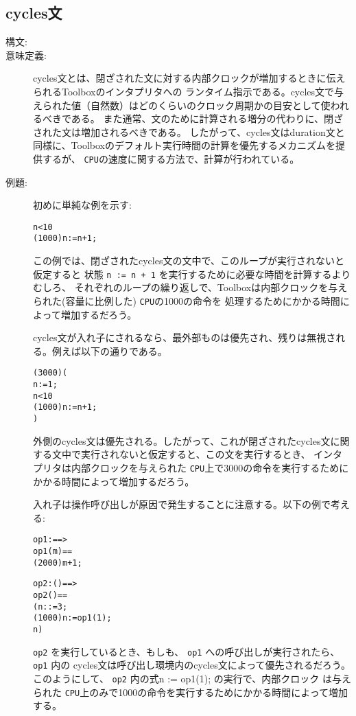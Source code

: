 \documentclass[\pformat,12pt]{jarticle}
\begin{document}
\subsection{cycles文}

\begin{description}
\item[構文:]

\item[意味定義:]
cycles文とは、閉ざされた文に対する内部クロックが増加するときに伝えられるToolboxのインタプリタへの
ランタイム指示である。cycles文で与えられた値（自然数）はどのくらいのクロック周期かの目安として使われるべきである。
また通常、文のために計算される増分の代わりに、閉ざされた文は増加されるべきである。
したがって、cycles文はduration文と同様に、Toolboxのデフォルト実行時間の計算を優先するメカニズムを提供するが、
 \texttt{CPU}の速度に関する方法で、計算が行われている。

\item[例題:]初めに単純な例を示す:
\begin{alltt}
       n < 10 
         (1000) n := n + 1; 
\end{alltt}
この例では、閉ざされたcycles文の文中で、このループが実行されないと仮定すると
状態 \texttt{n := n + 1} を実行するために必要な時間を計算するよりむしろ、
それぞれのループの繰り返しで、Toolboxは内部クロックを与えられた(容量に比例した) \texttt{CPU}の1000の命令を
処理するためにかかる時間によって増加するだろう。

cycles文が入れ子にされるなら、最外部ものは優先され、残りは無視される。例えば以下の通りである。
\begin{alltt}
      (3000)(
        n := 1;
         n < 10 
           (1000) n := n + 1; 
        )
\end{alltt}
外側のcycles文は優先される。したがって、これが閉ざされたcycles文に関する文中で実行されないと仮定すると、この文を実行するとき、
インタプリタは内部クロックを与えられた \texttt{CPU}上で3000の命令を実行するためにかかる時間によって増加するだろう。

入れ子は操作呼び出しが原因で発生することに注意する。以下の例で考える:
\begin{alltt}
      op1 :  ==> 
      op1(m) ==
        (2000)  m + 1;

      op2 : () ==> 
      op2() ==
      ( n :  := 3;
       (1000)  n := op1(1);
        n) 
\end{alltt}
 \texttt{op2} を実行しているとき、もしも、 \texttt{op1} への呼び出しが実行されたら、 \texttt{op1} 内の
cycles文は呼び出し環境内のcycles文によって優先されるだろう。このようにして、 \texttt{op2} 内の式n := op1(1); の実行で、内部クロック
は与えられた \texttt{CPU}上のみで1000の命令を実行するためにかかる時間によって増加する。
\end{description}
\end{document}
